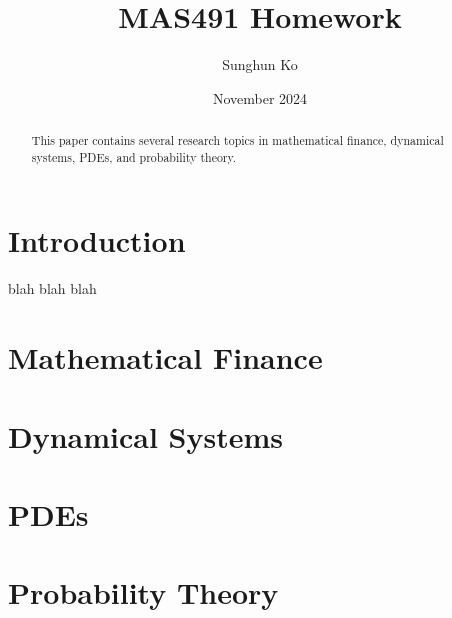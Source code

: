 \documentclass{article}
\title{MAS491 Homework}
\author{Sunghun Ko}
\date{November 2024}
\begin{document}
\maketitle

\tableofcontents

\begin{abstract}
This paper contains several research topics in mathematical finance, dynamical systems, PDEs, and probability theory.
\end{abstract}

\section{Introduction}
blah blah blah

\section{Mathematical Finance}

\section{Dynamical Systems}

\section{PDEs}

\section{Probability Theory}
\end{document}
